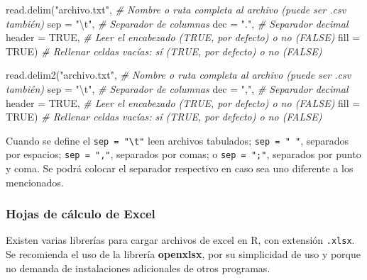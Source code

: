 \documentclass[
]{article}
\newenvironment{Shaded}{\begin{snugshade}}{\end{snugshade}}
\newcommand{\AttributeTok}[1]{\textcolor[rgb]{0.77,0.63,0.00}{#1}}
\newcommand{\CommentTok}[1]{\textcolor[rgb]{0.56,0.35,0.01}{\textit{#1}}}
\newcommand{\ConstantTok}[1]{\textcolor[rgb]{0.00,0.00,0.00}{#1}}
\newcommand{\FunctionTok}[1]{\textcolor[rgb]{0.00,0.00,0.00}{#1}}
\newcommand{\NormalTok}[1]{#1}
\newcommand{\SpecialCharTok}[1]{\textcolor[rgb]{0.00,0.00,0.00}{#1}}
\newcommand{\StringTok}[1]{\textcolor[rgb]{0.31,0.60,0.02}{#1}}
\theoremstyle{definition}
\theoremstyle{definition}
\theoremstyle{definition}
\theoremstyle{definition}
\theoremstyle{remark}
\begin{document}
\begin{Shaded}
\begin{Highlighting}[]
\FunctionTok{read.delim}\NormalTok{(}\StringTok{"archivo.txt"}\NormalTok{, }\CommentTok{\# Nombre o ruta completa al archivo (puede ser .csv también)}
         \AttributeTok{sep =} \StringTok{"}\SpecialCharTok{\textbackslash{}t}\StringTok{"}\NormalTok{,      }\CommentTok{\# Separador de columnas}
         \AttributeTok{dec =} \StringTok{"."}\NormalTok{,       }\CommentTok{\# Separador decimal}
         \AttributeTok{header =} \ConstantTok{TRUE}\NormalTok{,  }\CommentTok{\# Leer el encabezado (TRUE, por defecto) o no (FALSE)}
         \AttributeTok{fill =} \ConstantTok{TRUE}\NormalTok{)     }\CommentTok{\# Rellenar celdas vacías: sí (TRUE, por defecto) o no (FALSE)}

\FunctionTok{read.delim2}\NormalTok{(}\StringTok{"archivo.txt"}\NormalTok{, }\CommentTok{\# Nombre o ruta completa al archivo (puede ser .csv también)}
         \AttributeTok{sep =} \StringTok{"}\SpecialCharTok{\textbackslash{}t}\StringTok{"}\NormalTok{,      }\CommentTok{\# Separador de columnas}
         \AttributeTok{dec =} \StringTok{","}\NormalTok{,       }\CommentTok{\# Separador decimal}
         \AttributeTok{header =} \ConstantTok{TRUE}\NormalTok{,  }\CommentTok{\# Leer el encabezado (TRUE, por defecto) o no (FALSE)}
         \AttributeTok{fill =} \ConstantTok{TRUE}\NormalTok{)     }\CommentTok{\# Rellenar celdas vacías: sí (TRUE, por defecto) o no (FALSE)}
\end{Highlighting}
\end{Shaded}

Cuando se define el \texttt{sep\ =\ "\textbackslash{}t"} leen archivos tabulados; \texttt{sep\ =\ "\ "}, separados por espacios; \texttt{sep\ =\ ","}, separados por comas; o \texttt{sep\ =\ ";"}, separados por punto y coma. Se podrá colocar el separador respectivo en caso sea uno diferente a los mencionados.

\hypertarget{hojas-de-cuxe1lculo-de-excel}{%
\subsubsection{Hojas de cálculo de Excel}\label{hojas-de-cuxe1lculo-de-excel}}

Existen varias librerías para cargar archivos de excel en R, con extensión \texttt{.xlsx}. Se recomienda el uso de la librería \textbf{openxlsx}, por su simplicidad de uso y porque no demanda de instalaciones adicionales de otros programas.
\end{document}
